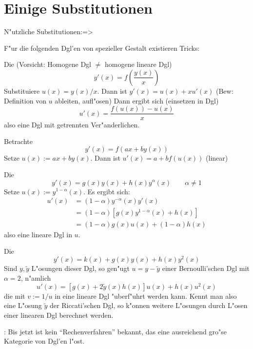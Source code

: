 \section{Einige Substitutionen}
\lessertheorem N"utzliche Substitutionen:=>{
  F"ur die folgenden Dgl'en von spezieller Gestalt existieren Tricks:
  \begin{stmts}
    \item Die  
      (Vorsicht: Homogene Dgl $\neq$ homogene lineare Dgl)
      \[y'(x)=f\left(\frac {y(x)} x\right)
        \]
      Substituiere $u(x)=y(x)/x$. Dann ist $y'(x)=u(x)+xu'(x)$ (Bew: Definition
      von $u$ ableiten, aufl"osen)
      Dann ergibt sich (einsetzen in Dgl)
      \[u'(x)=\frac{f(u(x))-u(x)} x
        \]
      also eine Dgl mit getrennten Ver"anderlichen.
    \item Betrachte
      \[y'(x)=f(ax+by(x))
        \]
      Setze $u(x):=ax+by(x)$. Dann ist $u'(x)=a+bf(u(x))$ (linear)
    \item Die 
      \[y'(x)=g(x)y(x)+h(x)y^\alpha(x)\qquad \alpha\neq 1
        \]
      Setze $u(x):=y^{1-\alpha}(x)$. Es ergibt sich:
      \begin{align*}
        u'(x) &= (1-\alpha)y^{-\alpha}(x)y'(x) \\
              &= (1-\alpha)\left[g(x)y^{1-\alpha}(x)+h(x)\right] \\
	      &= (1-\alpha)g(x)u(x)+(1-\alpha)h(x)
        \end{align*}
      also eine lineare Dgl in $u$.
    \item Die 
      \[y'(x)=k(x)+g(x)y(x)+h(x)y^2(x)
        \]
      Sind $y,\tilde y$ L"osungen dieser Dgl, so gen"ugt $u=y-\tilde y$
      einer Bernoulli'schen Dgl mit $\alpha=2$, n"amlich
      \[u'(x)=\left[g(x)+2\tilde y(x)h(x)\right]u(x)+h(x)u^2(x)
        \]
      die mit $v:=1/u$ in eine lineare Dgl "uberf"uhrt werden kann.
      Kennt man also eine L"osung $\tilde y$ der Riccati'schen
      Dgl, so k"onnen weitere L"osungen durch L"osen einer linearen
      Dgl berechnet werden.
    \end{stmts}
  }
\remark:{
  Bis jetzt ist kein ``Rechenverfahren'' bekannt, das eine ausreichend gro"se
  Kategorie von Dgl'en l"ost.
  }
